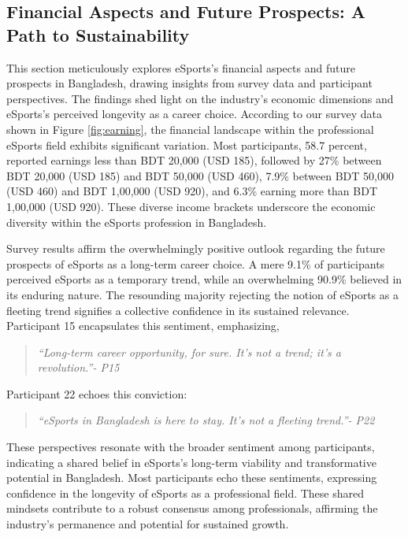 \documentclass[manuscript,screen,review,anonymous]{acmart}
\begin{document}
\subsection{Financial Aspects and Future Prospects: A Path to Sustainability}

This section meticulously explores eSports's financial aspects and future prospects in Bangladesh, drawing insights from survey data and participant perspectives. The findings shed light on the industry's economic dimensions and eSports's perceived longevity as a career choice. According to our survey data shown in Figure \ref{fig:earning}, the financial landscape within the professional eSports field exhibits significant variation. Most participants, 58.7 percent, reported earnings less than BDT 20,000 (USD 185), followed by 27\% between BDT 20,000 (USD 185) and BDT 50,000 (USD 460), 7.9\% between BDT 50,000 (USD 460) and BDT 1,00,000 (USD 920), and 6.3\% earning more than BDT 1,00,000 (USD 920). These diverse income brackets underscore the economic diversity within the eSports profession in Bangladesh.

Survey results affirm the overwhelmingly positive outlook regarding the future prospects of eSports as a long-term career choice. A mere 9.1\% of participants perceived eSports as a temporary trend, while an overwhelming 90.9\% believed in its enduring nature. The resounding majority rejecting the notion of eSports as a fleeting trend signifies a collective confidence in its sustained relevance. Participant 15 encapsulates this sentiment, emphasizing,

\begin{quote}
{\emph{``Long-term career opportunity, for sure. It's not a trend; it's a revolution.''- P15}}
\end{quote}

Participant 22 echoes this conviction:

\begin{quote}
{\emph{``eSports in Bangladesh is here to stay. It's not a fleeting trend.''- P22}}
\end{quote}

These perspectives resonate with the broader sentiment among participants, indicating a shared belief in eSports's long-term viability and transformative potential in Bangladesh. Most participants echo these sentiments, expressing confidence in the longevity of eSports as a professional field. These shared mindsets contribute to a robust consensus among professionals, affirming the industry's permanence and potential for sustained growth.
\end{document}
